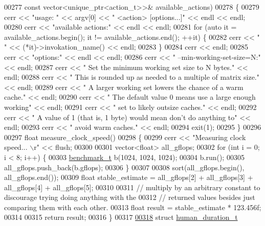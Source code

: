 \begin{DoxyCode}
00277                          \textcolor{keyword}{const} vector<unique\_ptr<action\_t>>& available\_actions)
00278 \{
00279   cerr << \textcolor{stringliteral}{"usage: "} << argv[0] << \textcolor{stringliteral}{" <action> [options...]"} << endl << endl;
00280   cerr << \textcolor{stringliteral}{"available actions:"} << endl << endl;
00281   \textcolor{keywordflow}{for} (\textcolor{keyword}{auto} it = available\_actions.begin(); it != available\_actions.end(); ++it) \{
00282     cerr << \textcolor{stringliteral}{"  "} << (*it)->invokation\_name() << endl;
00283   \}
00284   cerr << endl;
00285   cerr << \textcolor{stringliteral}{"options:"} << endl << endl;
00286   cerr << \textcolor{stringliteral}{"  --min-working-set-size=N:"} << endl;
00287   cerr << \textcolor{stringliteral}{"       Set the minimum working set size to N bytes."} << endl;
00288   cerr << \textcolor{stringliteral}{"       This is rounded up as needed to a multiple of matrix size."} << endl;
00289   cerr << \textcolor{stringliteral}{"       A larger working set lowers the chance of a warm cache."} << endl;
00290   cerr << \textcolor{stringliteral}{"       The default value 0 means use a large enough working"} << endl;
00291   cerr << \textcolor{stringliteral}{"       set to likely outsize caches."} << endl;
00292   cerr << \textcolor{stringliteral}{"       A value of 1 (that is, 1 byte) would mean don't do anything to"} << endl;
00293   cerr << \textcolor{stringliteral}{"       avoid warm caches."} << endl;
00294   exit(1);
00295 \}
00296      
00297 \textcolor{keywordtype}{float} measure\_clock\_speed()
00298 \{
00299   cerr << \textcolor{stringliteral}{"Measuring clock speed...                              \(\backslash\)r"} << flush;
00300           
00301   vector<float> all\_gflops;
00302   \textcolor{keywordflow}{for} (\textcolor{keywordtype}{int} i = 0; i < 8; i++) \{
00303     \hyperlink{structbenchmark__t}{benchmark\_t} b(1024, 1024, 1024);
00304     b.run();
00305     all\_gflops.push\_back(b.gflops);
00306   \}
00307 
00308   sort(all\_gflops.begin(), all\_gflops.end());
00309   \textcolor{keywordtype}{float} stable\_estimate = all\_gflops[2] + all\_gflops[3] + all\_gflops[4] + all\_gflops[5];
00310 
00311   \textcolor{comment}{// multiply by an arbitrary constant to discourage trying doing anything with the}
00312   \textcolor{comment}{// returned values besides just comparing them with each other.}
00313   \textcolor{keywordtype}{float} result = stable\_estimate * 123.456f;
00314 
00315   \textcolor{keywordflow}{return} result;
00316 \}
00317 
\hyperlink{structhuman__duration__t}{00318} \textcolor{keyword}{struct }\hyperlink{structhuman__duration__t}{human\_duration\_t}

\end{DoxyCode}
